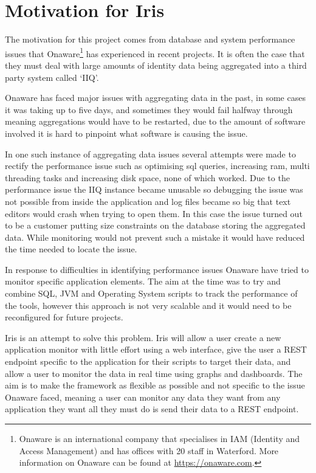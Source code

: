 \documentclass[12pt,a4paper,titlepage]{report}
\begin{document}
\section{Motivation for Iris}

The motivation for this project comes from database and system performance issues that Onaware\footnote{Onaware is an international company that specialises in IAM (Identity and Access Management) and has offices with 20 staff in Waterford. More information on Onaware can be found at \url{https://onaware.com}.} has experienced in recent projects. It is often the case that they must deal with large amounts of identity data being aggregated into a third party system called `IIQ'.

Onaware has faced major issues with aggregating data in the past, in some cases it was taking up to five days, and sometimes they would fail halfway through meaning aggregations would have to be restarted, due to the amount of software involved it is hard to pinpoint what software is causing the issue.

In one such instance of aggregating data issues several attempts were made to rectify the performance issue such as optimising sql queries, increasing ram, multi threading tasks and increasing disk space, none of which worked. Due to the performance issue the IIQ instance became unusable so debugging the issue was not possible from inside the application and log files became so big that text editors would crash when trying to open them. In this case the issue turned out to be a customer putting size constraints on the database storing the aggregated data. While monitoring would not prevent such a mistake it would have reduced the time needed to locate the issue.

In response to difficulties in identifying performance issues Onaware have tried to monitor specific application elements. The aim at the time was to try and combine SQL, JVM and Operating System scripts to track the performance of the tools, however this approach is not very scalable and it would need to be reconfigured for future projects.

Iris is an attempt to solve this problem. Iris will allow a user create a new application monitor with little effort using a web interface, give the user a REST endpoint specific to the application for their scripts to target their data, and allow a user to monitor the data in real time using graphs and dashboards. The aim is to make the framework as flexible as possible and not specific to the issue Onaware faced, meaning a user can monitor any data they want from any application they want all they must do is send their data to a REST endpoint.
\end{document}
